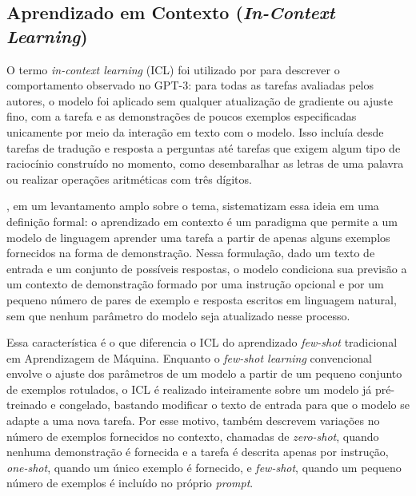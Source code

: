 
\subsection{Aprendizado em Contexto (\textit{In-Context Learning})}
\label{subsec:in-context-learning}

O termo \textit{in-context learning} (ICL) foi utilizado por \citet{brown2020language} para descrever o comportamento observado no GPT-3: para todas as tarefas avaliadas pelos autores, o modelo foi aplicado sem qualquer atualização de gradiente ou ajuste fino, com a tarefa e as demonstrações de poucos exemplos especificadas unicamente por meio da interação em texto com o modelo. Isso incluía desde tarefas de tradução e resposta a perguntas até tarefas que exigem algum tipo de raciocínio construído no momento, como desembaralhar as letras de uma palavra ou realizar operações aritméticas com três dígitos.

\citet{dong2022survey}, em um levantamento amplo sobre o tema, sistematizam essa ideia em uma definição formal: o aprendizado em contexto é um paradigma que permite a um modelo de linguagem aprender uma tarefa a partir de apenas alguns exemplos fornecidos na forma de demonstração. Nessa formulação, dado um texto de entrada e um conjunto de possíveis respostas, o modelo condiciona sua previsão a um contexto de demonstração formado por uma instrução opcional e por um pequeno número de pares de exemplo e resposta escritos em linguagem natural, sem que nenhum parâmetro do modelo seja atualizado nesse processo.

Essa característica é o que diferencia o ICL do aprendizado \textit{few-shot} tradicional em Aprendizagem de Máquina. Enquanto o \textit{few-shot learning} convencional envolve o ajuste dos parâmetros de um modelo a partir de um pequeno conjunto de exemplos rotulados, o ICL é realizado inteiramente sobre um modelo já pré-treinado e congelado, bastando modificar o texto de entrada para que o modelo se adapte a uma nova tarefa. Por esse motivo, \citet{brown2020language} também descrevem variações no número de exemplos fornecidos no contexto, chamadas de \textit{zero-shot}, quando nenhuma demonstração é fornecida e a tarefa é descrita apenas por instrução, \textit{one-shot}, quando um único exemplo é fornecido, e \textit{few-shot}, quando um pequeno número de exemplos é incluído no próprio \textit{prompt}.

